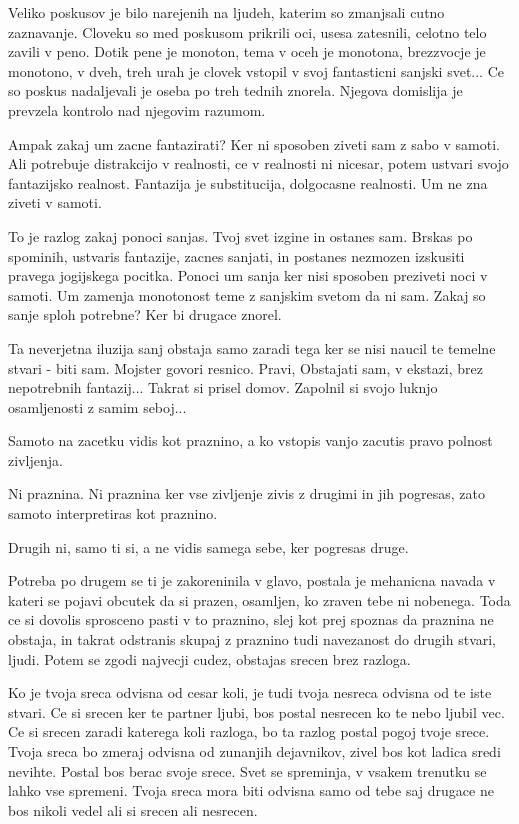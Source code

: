 Veliko poskusov je bilo narejenih na ljudeh, katerim so zmanjsali cutno zaznavanje. Cloveku so med poskusom prikrili oci, usesa zatesnili, celotno telo zavili v peno. Dotik pene je monoton, tema v oceh je monotona, brezzvocje je monotono, v dveh, treh urah je clovek vstopil v svoj fantasticni sanjski svet... Ce so poskus nadaljevali je oseba po treh tednih znorela. Njegova domislija je prevzela kontrolo nad njegovim razumom. 

Ampak zakaj um zacne fantazirati? Ker ni sposoben ziveti sam z sabo v samoti. Ali potrebuje distrakcijo v realnosti, ce v realnosti ni nicesar, potem ustvari svojo fantazijsko realnost. Fantazija je substitucija, dolgocasne realnosti. Um ne zna ziveti v samoti. 

To je razlog zakaj ponoci sanjas. Tvoj svet izgine in ostanes sam. Brskas po spominih, ustvaris fantazije, zacnes sanjati, in postanes nezmozen izskusiti pravega jogijskega pocitka. Ponoci um sanja ker nisi sposoben preziveti noci v samoti. Um zamenja monotonost teme z sanjskim svetom da ni sam. Zakaj so sanje sploh potrebne? Ker bi drugace znorel. 

Ta neverjetna iluzija sanj obstaja samo zaradi tega ker se nisi naucil te temelne stvari - biti sam. Mojster govori resnico. Pravi,  Obstajati sam, v ekstazi, brez nepotrebnih fantazij... Takrat si prisel domov. Zapolnil si svojo luknjo osamljenosti z samim seboj... 

Samoto na zacetku vidis kot praznino, a ko vstopis vanjo zacutis pravo polnost zivljenja. 

Ni praznina. Ni praznina ker vse zivljenje zivis z drugimi in jih pogresas, zato samoto interpretiras kot praznino. 

Drugih ni, samo ti si, a ne vidis samega sebe, ker pogresas druge. 

Potreba po drugem se ti je zakoreninila v glavo, postala je mehanicna navada v kateri se pojavi obcutek da si prazen, osamljen, ko zraven tebe ni nobenega. Toda ce si dovolis sprosceno pasti v to praznino, slej kot prej spoznas da praznina ne obstaja, in takrat odstranis skupaj z praznino tudi navezanost do drugih stvari, ljudi. Potem se zgodi najvecji cudez, obstajas srecen brez razloga. 

Ko je tvoja sreca odvisna od cesar koli, je tudi tvoja nesreca odvisna od te iste stvari. Ce si srecen ker te partner ljubi, bos postal nesrecen ko te nebo ljubil vec. Ce si srecen zaradi katerega koli razloga, bo ta razlog postal pogoj tvoje srece. Tvoja sreca bo zmeraj odvisna od zunanjih dejavnikov, zivel bos kot ladica sredi nevihte. Postal bos berac svoje srece. Svet se spreminja, v vsakem trenutku se lahko vse spremeni. Tvoja sreca mora biti odvisna samo od tebe saj drugace ne bos nikoli vedel ali si srecen ali nesrecen. 

